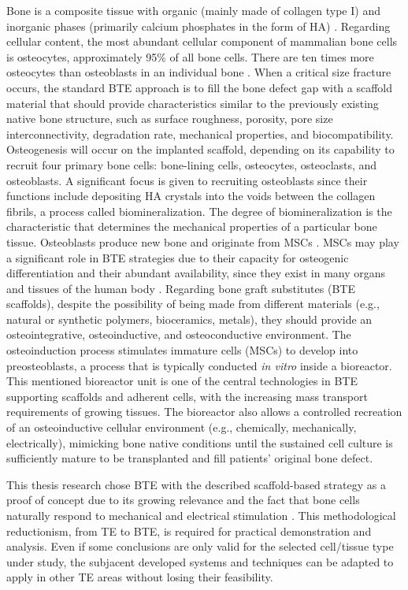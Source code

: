 Bone is a composite tissue with organic (mainly made of collagen type I) and inorganic phases (primarily calcium phosphates in the form of \ac{HA}) \cite{Peric_Kacarevic2020-hp}. Regarding cellular content, the most abundant cellular component of mammalian bone cells is osteocytes, approximately 95\% of all bone cells. There are ten times more osteocytes than osteoblasts in an individual bone \cite{Franz-Odendaal2006-eu}. When a critical size fracture occurs, the standard \ac{BTE} approach is to fill the bone defect gap with a scaffold material that should provide characteristics similar to the previously existing native bone structure, such as surface roughness, porosity, pore size interconnectivity, degradation rate, mechanical properties, and biocompatibility. Osteogenesis will occur on the implanted scaffold, depending on its capability to recruit four primary bone cells: bone-lining cells, osteocytes, osteoclasts, and osteoblasts. A significant focus is given to recruiting osteoblasts since their functions include depositing \ac{HA} crystals into the voids between the collagen fibrils, a process called biomineralization. The degree of biomineralization is the characteristic that determines the mechanical properties of a particular bone tissue. Osteoblasts produce new bone and originate from \ac{MSCs} \cite{Franz-Odendaal2006-eu}. \ac{MSCs} may play a significant role in \ac{BTE} strategies due to their capacity for osteogenic differentiation and their abundant availability, since they exist in many organs and tissues of the human body \cite{Guillot-Ferriols2022-wn}. Regarding bone graft substitutes (\ac{BTE} scaffolds), despite the possibility of being made from different materials (e.g., natural or synthetic polymers, bioceramics, metals), they should provide an osteointegrative, osteoinductive, and osteoconductive environment. The osteoinduction process stimulates immature cells (\ac{MSCs}) to develop into preosteoblasts, a process that is typically conducted \textit{in vitro} inside a bioreactor. This mentioned bioreactor unit is one of the central technologies in \ac{BTE} supporting scaffolds and adherent cells, with the increasing mass transport requirements of growing tissues. The bioreactor also allows a controlled recreation of an osteoinductive cellular environment (e.g., chemically, mechanically, electrically), mimicking bone native conditions until the sustained cell culture is sufficiently mature to be transplanted and fill patients' original bone defect.

This thesis research chose \ac{BTE} with the described scaffold-based strategy as a proof of concept due to its growing relevance and the fact that bone cells naturally respond to mechanical and electrical stimulation \cite{Wang2022-op, Nunez-Toldra2020-ai}. This methodological reductionism, from \ac{TE} to \ac{BTE}, is required for practical demonstration and analysis. Even if some conclusions are only valid for the selected cell/tissue type under study, the subjacent developed systems and techniques can be adapted to apply in other \ac{TE} areas without losing their feasibility.


